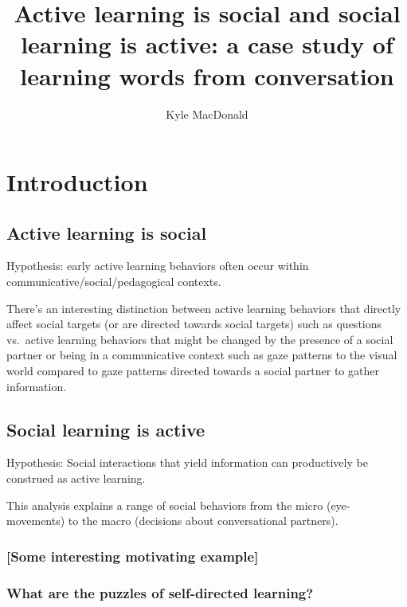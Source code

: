 \documentclass[a4paper,man,apacite,floatsintext]{apa6}
\date{}
\title{\textbf{Active learning is social and social learning is active: a case study of
learning words from conversation}}
\author{Kyle MacDonald}
\affiliation{Department of Psychology, Stanford University}
\begin{document}
\maketitle

\section{Introduction}\label{introduction}

\subsection{Active learning is social}\label{active-learning-is-social}

Hypothesis: early active learning behaviors often occur within
communicative/social/pedagogical contexts.

There's an interesting distinction between active learning behaviors
that directly affect social targets (or are directed towards social
targets) such as questions vs.~active learning behaviors that might be
changed by the presence of a social partner or being in a communicative
context such as gaze patterns to the visual world compared to gaze
patterns directed towards a social partner to gather information.

\subsection{Social learning is active}\label{social-learning-is-active}

Hypothesis: Social interactions that yield information can productively
be construed as active learning.

This analysis explains a range of social behaviors from the micro
(eye-movements) to the macro (decisions about conversational partners).

\subsubsection{{[}Some interesting motivating
example{]}}\label{some-interesting-motivating-example}

\subsubsection{What are the puzzles of self-directed
learning?}\label{what-are-the-puzzles-of-self-directed-learning}
\end{document}
